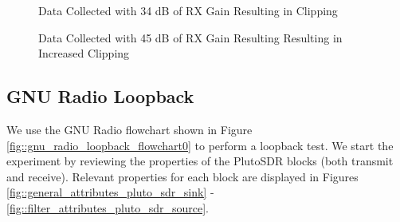 \documentclass{article}
\begin{document}
\begin{figure}[H]
	\centerline{}
	\caption{Data Collected with 34 dB of RX Gain Resulting in Clipping}
	\label{fig::matlab_loopback_agc_manual_34db_gain}
\end{figure}

\begin{figure}[H]
	\centerline{}
	\caption{Data Collected with 45 dB of RX Gain Resulting Resulting in Increased Clipping}
	\label{fig::matlab_loopback_agc_manual_45db_gain}
\end{figure}

\subsection{GNU Radio Loopback}

We use the GNU Radio flowchart shown in Figure \ref{fig::gnu_radio_loopback_flowchart0} to perform a loopback test. We start the experiment by reviewing the properties of the PlutoSDR blocks (both transmit and receive). Relevant properties for each block are displayed in Figures \ref{fig::general_attributes_pluto_sdr_sink} - \ref{fig::filter_attributes_pluto_sdr_source}.
\end{document}
